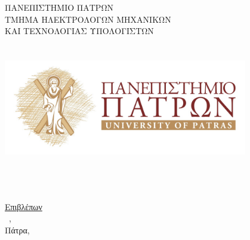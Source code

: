 \begin{titlepage}
  \begin{center}
    {\large ΠΑΝΕΠΙΣΤΗΜΙΟ ΠΑΤΡΩΝ}\\
    \large ΤΜΗΜΑ ΗΛΕΚΤΡΟΛΟΓΩΝ ΜΗΧΑΝΙΚΩΝ\\ΚΑΙ ΤΕΧΝΟΛΟΓΙΑΣ ΥΠΟΛΟΓΙΣΤΩΝ\\
    {\Large \divisionlarge \\
     \lablarge }\\[1cm]
    \hfill \break
    \includegraphics[width= 0.8\textwidth]{images/up_landscape.jpg}\\
    \hfill \break

    \textbf{\LARGE \doctitle }\\[3cm]
    {\uline{\LARGE{\shortdoctitle }}}\\ [0.5cm]

    {\LARGE \textbf{\nomme} }\\[0.5cm]
    \vfill
    \uline{\large Επιβλέπων}\\[0.5cm]
    \large \suptitle \, \supname, \supuni \\[1cm]
    \large{Πάτρα, \monthyear}
  \end{center}
\end{titlepage}